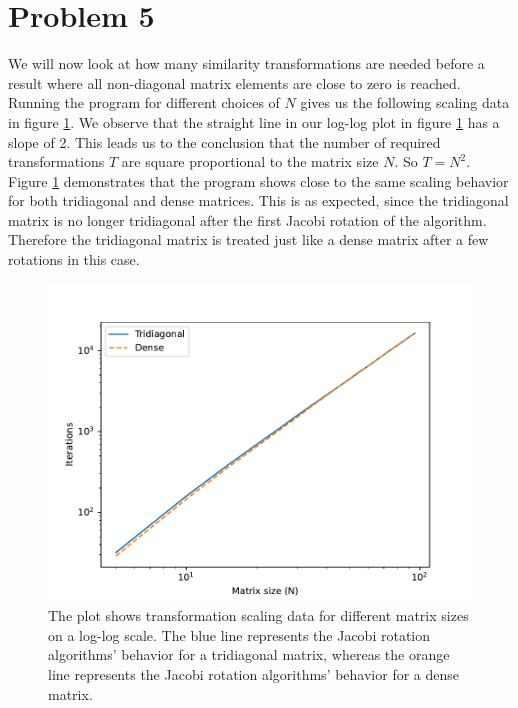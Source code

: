 \documentclass[english,notitlepage]{revtex4-1}  %
\begin{document}
\section*{Problem 5}
We will now look at how many similarity transformations are needed
before a result where all non-diagonal matrix elements
are close to zero is reached. \\

Running the program for different choices of $N$
gives us the following scaling data in figure \ref{fig:N_iter_log_both}.
We observe that the straight line in our log-log plot in figure \ref{fig:N_iter_log_both}
has a slope of 2. This leads us to the conclusion that the number of required transformations $T$ are
square proportional to the matrix size $N$. So $T = N^2$. \\

Figure \ref{fig:N_iter_log_both} demonstrates that the program shows close to
the same scaling behavior for both tridiagonal and dense matrices.
This is as expected, since the tridiagonal matrix is
no longer tridiagonal after the first Jacobi rotation of the algorithm.
Therefore the tridiagonal matrix is treated just like a dense matrix after a few
rotations in this case.

\begin{figure}[H]
    \centering
    \includegraphics[width=1.\textwidth]{../figures/N_iter_log_both.pdf}
    \caption{The plot shows transformation scaling data for different matrix sizes on a log-log scale.
    The blue line represents the Jacobi rotation algorithms' behavior for a tridiagonal matrix,
    whereas the orange line represents the Jacobi rotation algorithms' behavior for a dense matrix.}
    \label{fig:N_iter_log_both}
\end{figure}
\end{document}
